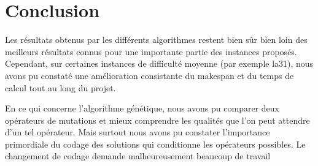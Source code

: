 \documentclass[french]{rapport}
\begin{document}
\section{Conclusion}

Les résultats obtenus par les différents algorithmes restent bien sûr bien loin des meilleurs
résultats connus pour une importante partie des instances proposés. Cependant, sur certaines
instances de difficulté moyenne (par exemple la31), nous avons pu constaté une amélioration
consistante du makespan et du temps de calcul tout au long du projet.

En ce qui concerne l'algorithme génétique, nous avons pu comparer deux opérateurs de mutations et
mieux comprendre les qualités que l'on peut attendre d'un tel opérateur. Mais surtout nous avons pu
constater l'importance primordiale du codage des solutions qui conditionne les opérateurs possibles.
Le changement de codage demande malheureusement beaucoup de travail
\end{document}
